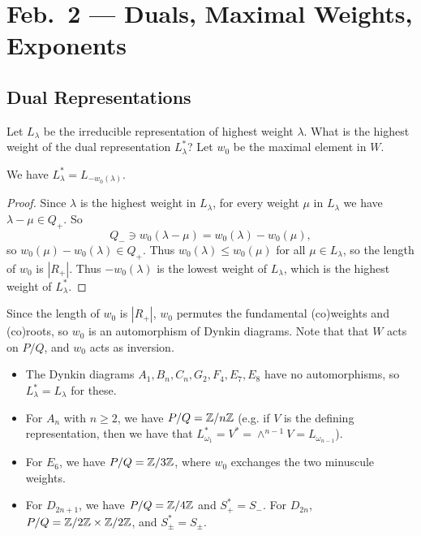 \chapter{Feb.~2 --- Duals, Maximal Weights, Exponents}

\section{Dual Representations}

\begin{remark}
  Let $L_\lambda$ be the
  irreducible representation of
  highest weight $\lambda$.
  What is the highest weight of the
  dual representation $L_\lambda^*$?
  Let $w_0$ be the maximal element
  in $W$.
\end{remark}

\begin{prop}
  We have $L_\lambda^* = L_{-w_0(\lambda)}$.
\end{prop}

\begin{proof}
  Since $\lambda$ is the highest weight
  in $L_\lambda$, for every
  weight $\mu$ in $L_\lambda$ we have
  $\lambda - \mu \in Q_+$. So
  \[
    Q_- \ni
    w_0(\lambda - \mu)
    = w_0(\lambda) - w_0(\mu),
  \]
  so $w_0(\mu) - w_0(\lambda) \in Q_+$.
  Thus $w_0(\lambda) \le w_0(\mu)$
  for all $\mu \in L_\lambda$, so the
  length of $w_0$ is $|R_+|$.
  Thus $-w_0(\lambda)$ is the
  lowest weight of $L_\lambda$, which
  is the highest weight of
  $L_\lambda^*$.
\end{proof}

\begin{example}
  Since the length of $w_0$ is
  $|R_+|$,
  $w_0$ permutes the fundamental
  (co)weights and (co)roots, so
  $w_0$ is an automorphism
  of Dynkin diagrams. Note that
  that $W$ acts on $P / Q$, and
  $w_0$ acts as inversion.
  \begin{itemize}
    \item
  The Dynkin diagrams
  $A_1, B_n, C_n, G_2, F_4, E_7, E_8$
  have no automorphisms, so
  $L_\lambda^* = L_\lambda$ for these.
  \item 
  For $A_n$ with $n \ge 2$, we have
  $P / Q = \mathbb{Z} / n\mathbb{Z}$ (e.g. if
  $V$ is the defining representation,
  then we have that $L_{\omega_1}^* = V^* = \wedge^{n - 1} V = L_{\omega_{n - 1}}$).
  \item
  For $E_6$, we have
  $P / Q = \mathbb{Z} / 3\mathbb{Z}$, where
  $w_0$ exchanges the two
  minuscule weights.
\item For $D_{2n + 1}$, we have
  $P / Q = \mathbb{Z} / 4\mathbb{Z}$ and
  $S_+^* = S_-$. For
  $D_{2n}$,
  $P / Q = \mathbb{Z} / 2\mathbb{Z} \times \mathbb{Z} / 2\mathbb{Z}$,
  and $S_{\pm}^* = S_{\pm}$.
  \end{itemize}
\end{example}


